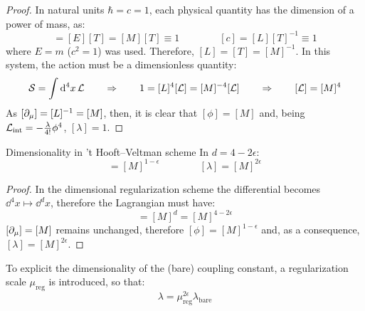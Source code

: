 \begin{proofbox}
  \begin{proof}
    In natural units $ \hbar = c = 1 $, each physical quantity has the dimension of a power of mass, as:
    \begin{equation*}
      [\hbar] = [E] [T] = [M] [T] \equiv 1
      \qquad \qquad
      [c] = [L] [T]^{-1} \equiv 1
    \end{equation*}
    where $ E = m $ ($ c^2 = 1 $) was used. Therefore, $ [L] = [T] = [M]^{-1} $. In this system, the action must be a dimensionless quantity:
    \begin{equation*}
      \mathcal{S} = \int \mathrm{d}^4x \,\mathcal{L}
      \qquad \Rightarrow \qquad
      1 = [L]^4 [\mathcal{L}] = [M]^{-4} [\mathcal{L}]
      \qquad \Rightarrow \qquad
      [\mathcal{L}] = [M]^4
    \end{equation*}
    As $ [\partial_\mu] = [L]^{-1} = [M] $, then, it is clear that $ [\phi] = [M] $ and, being $ \mathcal{L}_\text{int} = - \frac{\lambda}{4!} \phi^4 $, $ [\lambda] = 1 $.
  \end{proof}
\end{proofbox}

\begin{proposition}{Dimensionality in 't Hooft--Veltman scheme}{}
  In $ d = 4 - 2\epsilon $:
  \begin{equation}
    [\phi] = [M]^{1 - \epsilon}
    \qquad \qquad
    [\lambda] = [M]^{2\epsilon}
  \end{equation}
\end{proposition}

\begin{proofbox}
  \begin{proof}
    In the dimensional regularization scheme the differential becomes $ \dd^4x \mapsto \dd^dx $, therefore the Lagrangian must have:
    \begin{equation*}
      [\lag] = [M]^d = [M]^{4 - 2\epsilon}
    \end{equation*}
    $ [\partial_\mu] = [M] $ remains unchanged, therefore $ [\phi] = [M]^{1 - \epsilon} $ and, as a consequence, $ [\lambda] = [M]^{2\epsilon} $.
  \end{proof}
\end{proofbox}

To explicit the dimensionality of the (bare) coupling constant, a regularization scale $ \mu_\text{reg} $ is introduced, so that:
\begin{equation}
  \lambda = \mu_\text{reg}^{2\epsilon} \lambda_\text{bare}
\end{equation}

